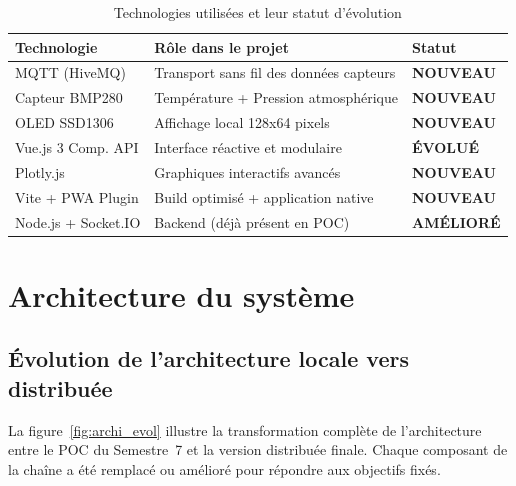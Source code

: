 \documentclass[12pt, a4paper]{report}
\begin{document}
\begin{table}[H]
\centering
\renewcommand{\arraystretch}{1.4}
\begin{tabularx}{\linewidth}{|l|X|l|}
\hline
\rowcolor{bleuFonce!10}
\textbf{Technologie} & \textbf{R\^ole dans le projet} & \textbf{Statut} \\
\hline
MQTT (HiveMQ) & Transport sans fil des donn\'ees capteurs &
  \textcolor{vertOK}{\textbf{NOUVEAU}} \\
\hline
Capteur BMP280 & Temp\'erature + Pression atmosph\'erique &
  \textcolor{vertOK}{\textbf{NOUVEAU}} \\
\hline
OLED SSD1306 & Affichage local 128x64 pixels &
  \textcolor{vertOK}{\textbf{NOUVEAU}} \\
\hline
Vue.js 3 Comp. API & Interface r\'eactive et modulaire &
  \textcolor{jauneEvol}{\textbf{\'EVOLU\'E}} \\
\hline
Plotly.js & Graphiques interactifs avanc\'es &
  \textcolor{vertOK}{\textbf{NOUVEAU}} \\
\hline
Vite + PWA Plugin & Build optimis\'e + application native &
  \textcolor{vertOK}{\textbf{NOUVEAU}} \\
\hline
Node.js + Socket.IO & Backend (d\'ej\`a pr\'esent en POC) &
  \textcolor{jauneEvol}{\textbf{AM\'ELIOR\'E}} \\
\hline
\end{tabularx}
\caption{Technologies utilis\'ees et leur statut d'\'evolution}
\label{tab:techno}
\end{table}

\chapter{Architecture du syst\`eme}

\section{\'Evolution de l'architecture locale vers distribu\'ee}

La figure~\ref{fig:archi_evol} illustre la transformation compl\`ete
de l'architecture entre le POC du Semestre~7 et la version distribu\'ee
finale. Chaque composant de la cha\^ine a \'et\'e remplac\'e ou
am\'elior\'e pour r\'epondre aux objectifs fix\'es.
\end{document}
